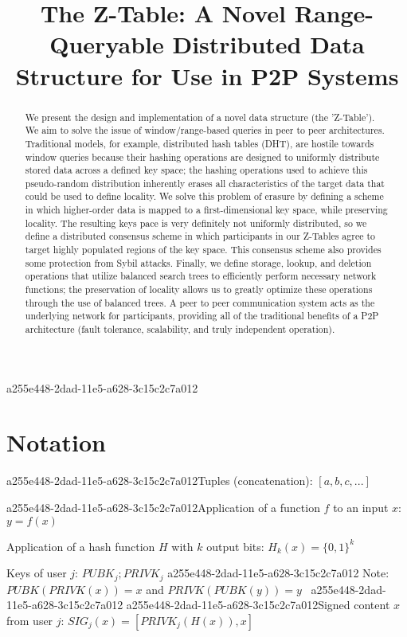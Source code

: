 \documentclass[12pt]{article}
\title{The Z-Table: A Novel Range-Queryable Distributed Data Structure for Use in P2P Systems}
\begin{document}
\maketitle
a255e448-2dad-11e5-a628-3c15c2c7a012
\begin{abstract}
We present the design and implementation of a novel data structure (the 'Z-Table'). We aim to solve the issue of window/range-based queries in peer to peer architectures. Traditional models, for example,  distributed hash tables (DHT), are hostile towards window queries because their hashing operations are designed to uniformly distribute stored data across a defined key space; the hashing operations used to achieve this pseudo-random distribution inherently erases all characteristics of the target data that could be used to define locality. We solve this problem of erasure by defining a scheme in which higher-order data is mapped to a first-dimensional key space, while preserving locality. The resulting keys pace is very definitely not uniformly distributed, so we define a distributed consensus scheme in which participants in our Z-Tables agree to target highly populated regions of the key space. This consensus scheme also provides some protection from Sybil attacks. Finally, we define storage, lookup, and deletion operations that utilize balanced search trees to efficiently perform necessary network functions; the preservation of locality allows us to greatly optimize these operations through the use of balanced trees. A peer to peer communication system acts as the underlying network for participants, providing all of the traditional benefits of a P2P architecture (fault tolerance, scalability, and truly independent operation).
\end{abstract}

\section{Notation}

a255e448-2dad-11e5-a628-3c15c2c7a012Tuples (concatenation): $[a,b,c,...]$

a255e448-2dad-11e5-a628-3c15c2c7a012Application of a function $f$ to an input $x$: $y=f(x)$

Application of a hash function $H$ with $k$ output bits: $H_{k}(x) = \{0,1\}^k$

Keys of user $j$: $ PUBK_j; PRIVK_j $
a255e448-2dad-11e5-a628-3c15c2c7a012
Note: $PUBK(PRIVK(x)) = x$ and $PRIVK(PUBK(y)) = y$~
a255e448-2dad-11e5-a628-3c15c2c7a012
a255e448-2dad-11e5-a628-3c15c2c7a012Signed content $x$ from user $j$: $SIG_j(x) = \left[ PRIVK_j( H(x) ), x \right]$
\end{document}
